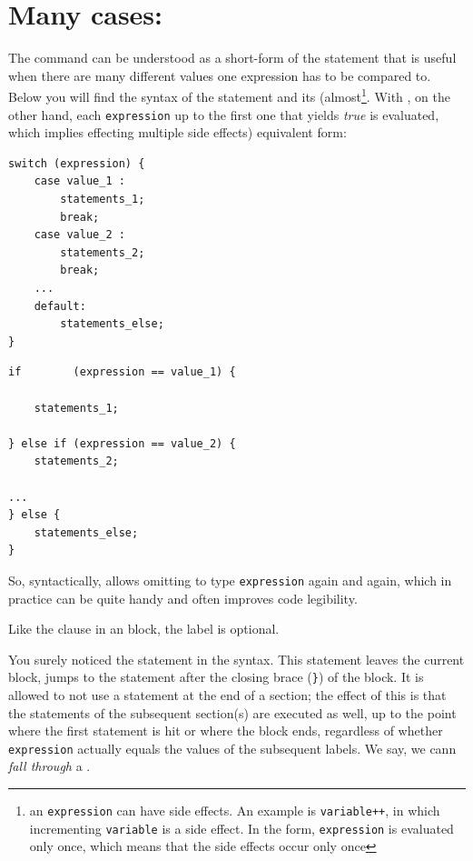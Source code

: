 \section{Many cases: }
The command  can be understood as a short-form of the  statement that is useful when there are many different values one expression has to be compared to. Below you will find the syntax of the  statement and its (almost\footnote{an \texttt{expression} can have side effects. An example is \texttt{variable++}, in which incrementing \texttt{variable} is a side effect. In the  form, \texttt{expression} is evaluated only once, which means that the side effects occur only once}. With , on the other hand, each \texttt{expression} up to the first one that yields \emph{true} is evaluated, which implies effecting multiple side effects) equivalent  form:

\begin{tcbraster}[raster columns=2,
                  raster equal height,
                  nobeforeafter,
                  raster column skip=0.2cm]
\begin{codebox}
\begin{verbatim}
switch (expression) {
    case value_1 :
        statements_1;
        break;
    case value_2 :
        statements_2;
        break;
    ...
    default:
        statements_else;
}
\end{verbatim}
\end{codebox}
%
\begin{codebox}
\begin{verbatim}
if        (expression == value_1) {

    statements_1;
    
} else if (expression == value_2) {
    statements_2;
    
...
} else {
    statements_else;
}
\end{verbatim}
\end{codebox}
\end{tcbraster}

So, syntactically,  allows omitting to type \texttt{expression} again and again, which in practice can be quite handy and often improves code legibility.

Like the  clause in an  block, the  label is optional.

You surely noticed the  statement in the  syntax. This statement leaves the current block, \ie jumps to the statement after the closing brace (\texttt{\}}) of the  block. It is allowed to not use a  statement at the end of a  section; the effect of this is that the statements of the subsequent  section(s) are executed as well, up to the point where the first  statement is hit or where the  block ends, regardless of whether \texttt{expression} actually equals the values of the subsequent  labels. We say, we cann \emph{fall through} a .

